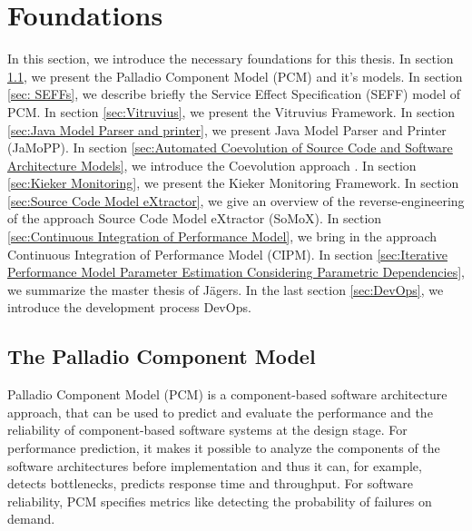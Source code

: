 

\chapter{Foundations}
\label{ch:Foundations}
In this section, we introduce the necessary foundations for this thesis. In section \ref{sec:The Palladio Component Model}, we present the Palladio Component Model (PCM) and it's models. In section \ref{sec: SEFFs}, we describe briefly the Service Effect Specification (SEFF) model of PCM. In section \ref{sec:Vitruvius}, we present the Vitruvius Framework. In section \ref{sec:Java Model Parser and printer}, we present Java Model Parser and Printer (JaMoPP). In section \ref{sec:Automated Coevolution of Source Code and Software Architecture Models}, we introduce the Coevolution approach \cite{langhammer2015co}. In section \ref{sec:Kieker Monitoring}, we present the Kieker Monitoring Framework. In section \ref{sec:Source Code Model eXtractor}, we give an overview of the reverse-engineering of the approach Source Code Model eXtractor (SoMoX). In section \ref{sec:Continuous Integration of Performance Model}, we bring in the approach Continuous Integration of Performance Model (CIPM). In section \ref{sec:Iterative Performance Model Parameter Estimation Considering Parametric Dependencies}, we summarize the master thesis of Jägers. In the last section \ref{sec:DevOps}, we introduce the development process DevOps.

\section{The Palladio Component Model}
\label{sec:The Palladio Component Model}
Palladio Component Model (PCM) is a component-based software architecture approach, that can be used to predict and evaluate the performance and the reliability of component-based software systems at the design stage. For performance prediction, it makes it possible to analyze the components of the software architectures before implementation and thus it can, for example, detects bottlenecks, predicts response time and throughput. For software reliability, PCM specifies metrics like detecting the probability of failures on demand. 

